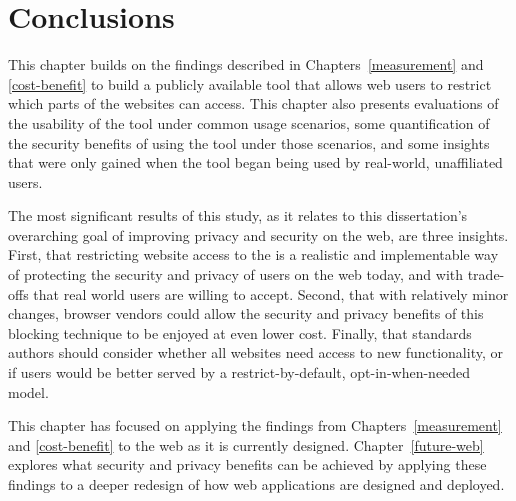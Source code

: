 \section{Conclusions}
\label{current-web:conclusions}

This chapter builds on the findings described in Chapters~\ref{measurement} and
\ref{cost-benefit} to build a publicly available tool that allows web users to
restrict which parts of the \WAPI websites can access.  This chapter also
presents evaluations of the usability of the tool under common usage scenarios,
some quantification of the security benefits of using the tool under those
scenarios, and some insights that were only gained when the tool began being
used by real-world, unaffiliated users.

The most significant results of this study, as it relates to this
dissertation's overarching goal of improving privacy and security on the web,
are three insights.  First, that restricting website access to the \WAPI is
a realistic and implementable way of protecting the security and privacy of
users on the web today, and with trade-offs that real world users are willing
to accept.  Second, that with relatively minor changes, browser vendors
could allow the security and privacy benefits of this \WAPI blocking technique
to be enjoyed at even lower cost.  Finally, that standards authors should
consider whether all websites need access to new \WAPI functionality, or if
users would be better served by a restrict-by-default, opt-in-when-needed model.

This chapter has focused on applying the findings from
Chapters~\ref{measurement} and \ref{cost-benefit} to the web as it is currently
designed.  Chapter~\ref{future-web} explores what security and privacy
benefits can be achieved by applying these findings to a deeper redesign of
how web applications are designed and deployed.
